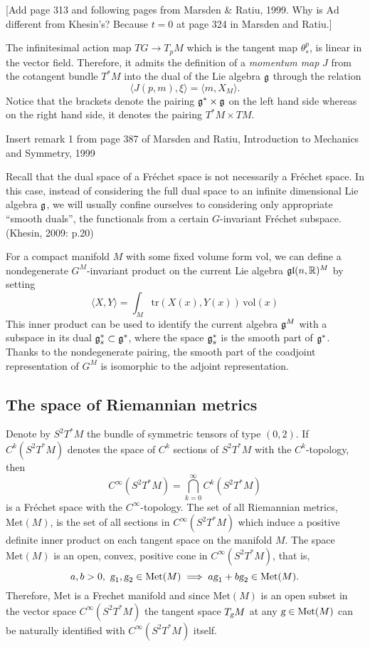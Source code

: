 \documentclass{article}
\theoremstyle{plain}
\theoremstyle{definition}
\numberwithin{equation}{section}
\newcommand{\R}{\ensuremath{\mathbb{R}}}
\newcommand{\g}{\ensuremath{\textsl{g}}}
\newcommand{\Met}{\ensuremath{\mathrm{Met}}}
\newcommand{\Vol}{\ensuremath{\mathrm{vol}}}
\newcommand{\Ad}{\ensuremath{\mathrm{Ad}}}
\newcommand{\tr}{\ensuremath{\mathrm{tr}}}
\newcommand{\mf}{\ensuremath{\mathfrak}}
\begin{document}
[Add page 313 and following pages from Marsden \& Ratiu, 1999. Why is $\Ad$ different from Khesin's? Because $t=0$ at page 324 in Marsden and Ratiu.]

The infinitesimal action map $TG\to T_pM$ which is the tangent map $\theta^p_*$, is linear in the vector field. Therefore, it admits the definition of a \textit{momentum map} $J$ from the cotangent bundle $T^*M$ into the dual of the Lie algebra $\mf g$ through the relation
\[
\langle J(p,m),\xi\rangle = \langle m,X_M\rangle.
\]
Notice that the brackets denote the pairing $\mf g^*\times\mf g$ on the left hand side whereas on the right hand side, it denotes the pairing $T^*M\times TM$.

Insert remark 1 from page 387 of Marsden and Ratiu, Introduction to Mechanics and Symmetry, 1999



Recall that the dual space of a Fréchet space is not necessarily a Fréchet space. In this case, instead of considering the full dual space to an infinite dimensional Lie algebra $\mf g$, we will usually confine ourselves to considering only appropriate ``smooth duals'', the functionals from a certain $G$-invariant Fréchet subspace. (Khesin, 2009: p.20)

For a compact manifold $M$ with some fixed volume form $\Vol$, we can
define a nondegenerate $G^M$-invariant product on the current Lie algebra $\mf g\mf l(n,\R)^M$ by setting
\[
\langle X,Y\rangle = \int_M\tr(X(x),Y(x))\,\Vol(x)
\]
This inner product can be used to identify the current algebra $\mf g^M$ with a subspace in its dual $\mf g_s^*\subset \mf g^*$, where the space $\mf g_s^*$ is the smooth part of $\mf g^*$. Thanks to the nondegenerate pairing, the smooth part of the coadjoint representation of $G^M$ is isomorphic to the adjoint representation.




\subsection{The space of Riemannian metrics}
Denote by $S^2T^*M$ the bundle of  symmetric tensors of type $(0,2)$. If $C^k(S^2T^*M)$ denotes the space of $C^k$ sections of  $S^2T^*M$ with the $C^k$-topology, then
\[
C^\infty (S^2T^*M) = \bigcap_{k=0}^\infty C^k(S^2T^*M)
\]
is a Fréchet space with the $C^\infty$-topology. The set of all Riemannian metrics, $\Met(M)$, is the set of all sections in $C^\infty (S^2T^*M)$ which induce a positive definite inner product on each tangent space on the manifold $M$.
The space $\Met(M)$ is an open, convex, positive cone in $C^\infty(S^2T^*M)$, that is,
\[
a,b>0,\ \g_1,\g_2\in \Met(M) \implies a\g_1+b\g_2\in\Met(M).
\]
Therefore, $\Met$ is a Frechet manifold and since $\Met(M)$ is an open subset in the vector space $C^\infty (S^2T^*M)$  the tangent space $T_\g M$ at any $\g\in \Met(M)$ can be naturally identified with $C^\infty (S^2T^*M)$ itself.
\end{document}
